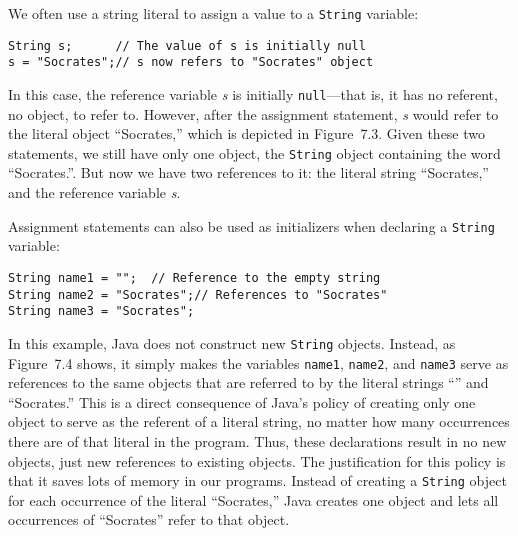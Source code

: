 We often use a string literal to assign a value to a {\tt String}
variable: 

\begin{jjjlisting}
\begin{lstlisting}
String s;      // The value of s is initially null
s = "Socrates";// s now refers to "Socrates" object
\end{lstlisting}
\end{jjjlisting}

\noindent In this case, the reference variable {\it s} is initially
{\tt null}---that is, it has no referent, no object, to refer to.
However, after the assignment statement, {\it s} would refer to the
literal object ``Socrates,'' which is depicted in Figure~7.3. Given
these two statements, we still have only one object, the {\tt String}
object containing the word ``Socrates.''.  But now we have two
references to it: the literal string ``Socrates,'' and the reference
variable {\it s}.

Assignment statements can also be used as initializers when declaring
a {\tt String} variable:

\begin{jjjlisting}
\begin{lstlisting}
String name1 = "";  // Reference to the empty string
String name2 = "Socrates";// References to "Socrates"
String name3 = "Socrates";
\end{lstlisting}
\end{jjjlisting}

\noindent In this example, Java does not construct new {\tt String}
objects.  Instead, as Figure~7.4 shows, it simply makes the variables
{\tt name1}, {\tt name2}, and {\tt name3} serve as references to the
same objects that are referred to by the literal strings ``'' and
``Socrates.'' This is a direct consequence of Java's policy of
creating only one object to serve as the referent of a literal string,
no matter how many occurrences there are of that literal in the
program.  Thus, these declarations result in no new objects, just new
references to existing objects.  The justification for this policy is
that it saves lots of memory in our programs. Instead of creating a
{\tt String} object for each occurrence of the literal ``Socrates,''
Java creates one object and lets all occurrences of ``Socrates'' refer
to that object.

